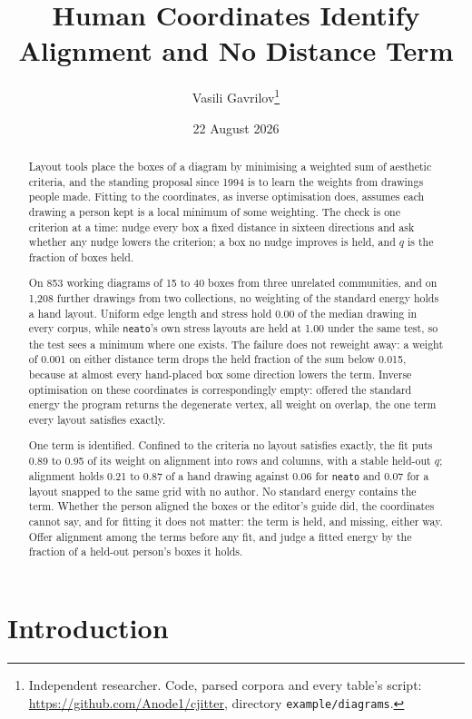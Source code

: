 \documentclass[11pt]{article}
\title{\textbf{Human Coordinates Identify Alignment and No Distance Term}}
\author{Vasili Gavrilov\thanks{Independent researcher. Code, parsed corpora and every
table's script: \url{https://github.com/Anode1/cjitter}, directory
\texttt{example/diagrams}.}}
\date{22 August 2026}
\begin{document}
\maketitle

\begin{abstract}
Layout tools place the boxes of a diagram by minimising a weighted sum of aesthetic
criteria, and the standing proposal since 1994 is to learn the weights from drawings
people made. Fitting to the coordinates, as inverse optimisation does, assumes each
drawing a person kept is a local minimum of some weighting. The check is one criterion at
a time: nudge every box a fixed distance in sixteen directions and ask whether any nudge
lowers the criterion; a box no nudge improves is held, and $q$ is the fraction of boxes
held.

On 853 working diagrams of 15 to 40 boxes from three unrelated communities, and on 1,208
further drawings from two collections, no weighting of the standard energy holds a hand
layout. Uniform edge length and stress hold 0.00 of the median drawing in every corpus,
while \texttt{neato}'s own stress layouts are held at 1.00 under the same test, so the
test sees a minimum where one exists. The failure does not reweight away: a weight of
0.001 on either distance term drops the held fraction of the sum below 0.015, because at
almost every hand-placed box some direction lowers the term. Inverse optimisation on these
coordinates is correspondingly empty: offered the standard energy the program returns the
degenerate vertex, all weight on overlap, the one term every layout satisfies exactly.

One term is identified. Confined to the criteria no layout satisfies exactly, the fit puts
0.89 to 0.95 of its weight on alignment into rows and columns, with a stable held-out $q$;
alignment holds 0.21 to 0.87 of a hand drawing against 0.06 for \texttt{neato} and 0.07
for a layout snapped to the same grid with no author. No standard energy contains the
term. Whether the person aligned the boxes or the editor's guide did, the coordinates
cannot say, and for fitting it does not matter: the term is held, and missing, either way.
Offer alignment among the terms before any fit, and judge a fitted energy by the fraction
of a held-out person's boxes it holds.
\end{abstract}

\section{Introduction}
\end{document}
